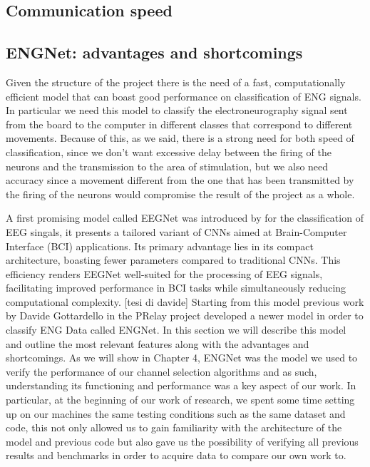\documentclass{Configuration_Files/PoliMi3i_thesis}
\begin{document}
\subsection{Communication speed}

\subsection{ENGNet: advantages and shortcomings}

Given the structure of the project there is the need of a fast, computationally efficient model that can boast good performance on classification of ENG signals.
In particular we need this model to classify the electroneurography signal sent from the board to the computer in different classes that correspond to different movements.
Because of this, as we said, there is a strong need for both speed of classification, since we don't want excessive delay between the firing of the neurons and the transmission to the area of stimulation, but we also need accuracy since a movement different from the one that has been transmitted by the firing of the neurons would compromise the result of the project as a whole.

A first promising model called EEGNet was introduced by \cite{lawhernEEGNetCompactConvolutional2018} for the classification of EEG singals, it presents a tailored variant of CNNs aimed at Brain-Computer Interface (BCI) applications. Its primary advantage lies in its compact architecture, boasting fewer parameters compared to traditional CNNs. This efficiency renders EEGNet well-suited for the processing of EEG signals, facilitating improved performance in BCI tasks while simultaneously reducing computational complexity. [tesi di davide]
Starting from this model previous work by Davide Gottardello in the PRelay project developed a newer model in order to classify ENG Data called ENGNet.
In this section we will describe this model and outline the most relevant features along with the advantages and shortcomings.
As we will show in Chapter 4, ENGNet was the model we used to verify the performance of our channel selection algorithms and as such, understanding its functioning and performance was a key aspect of our work.
In particular, at the beginning of our work of research, we spent some time setting up on our machines the same testing conditions such as the same dataset and code, this not only allowed us to gain familiarity with the architecture of the model and previous code but also gave us the possibility of verifying all previous results and benchmarks in order to acquire data to compare our own work to. 
\end{document}
